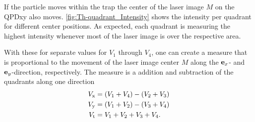 If the particle moves within the trap the center of the laser image $M$ on the 
QPDxy also moves. \cref{fig:Th-quadrant_Intensity} shows the intensity per 
quadrant for different center positions. As expected, each quadrant is 
measuring the highest intensity whenever most of the laser image is over the 
respective area.

With these for separate values for $V_{1}$ through $V_{4}$, one can create a 
measure that is proportional to the movement of the laser image center $M$ 
along the $\vb{e}_{x}$- and $\vb{e}_{y}$-direction, respectively. The measure is a addition 
and subtraction of the quadrants along one direction
\begin{subequations}
\begin{align}
  V_{\mathrm{x}} & = \left( V_{\mathrm{1}}+V_{\mathrm{4}} \right) - \left( V_{\mathrm{2}} + 
  V_{\mathrm{3}}  \right)
  \label{eq:Th-Vx} \\
  V_{\mathrm{y}} & = \left( V_{\mathrm{1}}+V_{\mathrm{2}} \right) - \left( V_{\mathrm{3}} + 
  V_{\mathrm{4}}  \right)
  \label{eq:Th-Vy} \\
  V_{\mathrm{t}} & = V_{\mathrm{1}}+V_{\mathrm{2}} + V_{\mathrm{3}} + V_{\mathrm{4}}.
  \label{eq:Th-Vt}
\end{align}
\end{subequations}

